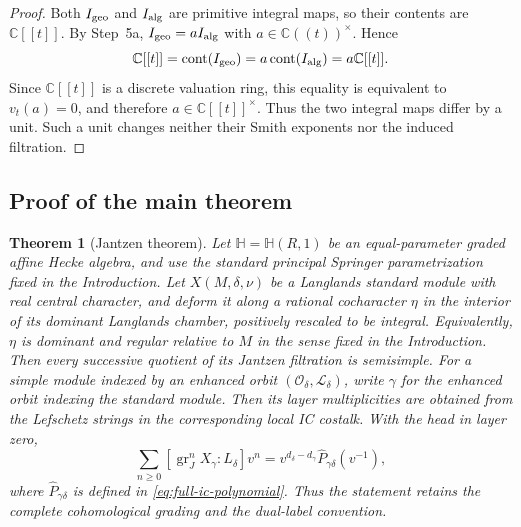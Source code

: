 \documentclass[11pt]{amsart}
\newtheorem{theorem}{Theorem}[section]
\theoremstyle{definition}
\theoremstyle{remark}
\newcommand{\Hh}{\mathbb H}
\newcommand{\C}{\mathbb C}
\newcommand{\A}{\C[[t]]}
\newcommand{\K}{\C((t))}
\begin{document}
\begin{proof}
Both $I_{\rm geo}$ and $I_{\rm alg}$ are primitive integral maps, so their
contents are $\A$.  By Step~5a,
$I_{\rm geo}=aI_{\rm alg}$ with $a\in\K^\times$.  Hence
\[
 \A=\operatorname{cont}(I_{\rm geo})
 =a\operatorname{cont}(I_{\rm alg})=a\A.
\]
Since $\A$ is a discrete valuation ring, this equality is equivalent to
$v_t(a)=0$, and therefore $a\in\A^\times$.  Thus the two integral maps
differ by a unit.  Such a unit changes neither their Smith exponents nor the
induced filtration.
\end{proof}

\subsection{Proof of the main theorem}

\begin{theorem}[Jantzen theorem]
\label{thm:equal-parameter-jantzen}
Let $\Hh=\Hh(R,1)$ be an equal-parameter graded affine Hecke algebra, and use
the standard principal Springer parametrization fixed in the Introduction.
Let $X(M,\delta,\nu)$ be a Langlands standard module with real central
character, and deform it along a rational cocharacter $\eta$ in the
interior of its dominant Langlands chamber, positively rescaled to be
integral.  Equivalently, $\eta$ is dominant and regular relative to $M$ in
the sense fixed in the Introduction.  Then every
successive quotient of its Jantzen filtration is semisimple.  For a simple
module indexed by an enhanced orbit $(\mathcal O_\delta,\mathcal L_\delta)$,
write $\gamma$ for the enhanced orbit indexing the standard module.  Then
its layer multiplicities are obtained from the Lefschetz strings in the
corresponding local IC costalk.  With the head in layer zero,
\[
 \sum_{n\geq 0}[\operatorname{gr}_J^nX_\gamma:L_\delta]v^n
 =v^{d_\delta-d_\gamma}\widehat P_{\gamma\delta}(v^{-1}),
\]
where $\widehat P_{\gamma\delta}$ is defined in
\eqref{eq:full-ic-polynomial}.  Thus the statement retains the complete
cohomological grading and the dual-label convention.
\end{theorem}
\end{document}
